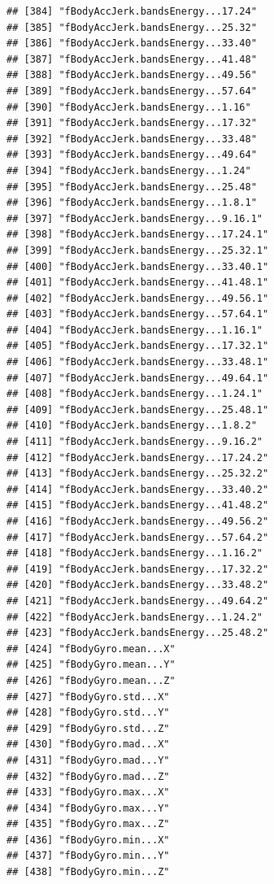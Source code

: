 \documentclass[
]{article}
\begin{document}
\begin{verbatim}
## [384] "fBodyAccJerk.bandsEnergy...17.24"    
## [385] "fBodyAccJerk.bandsEnergy...25.32"    
## [386] "fBodyAccJerk.bandsEnergy...33.40"    
## [387] "fBodyAccJerk.bandsEnergy...41.48"    
## [388] "fBodyAccJerk.bandsEnergy...49.56"    
## [389] "fBodyAccJerk.bandsEnergy...57.64"    
## [390] "fBodyAccJerk.bandsEnergy...1.16"     
## [391] "fBodyAccJerk.bandsEnergy...17.32"    
## [392] "fBodyAccJerk.bandsEnergy...33.48"    
## [393] "fBodyAccJerk.bandsEnergy...49.64"    
## [394] "fBodyAccJerk.bandsEnergy...1.24"     
## [395] "fBodyAccJerk.bandsEnergy...25.48"    
## [396] "fBodyAccJerk.bandsEnergy...1.8.1"    
## [397] "fBodyAccJerk.bandsEnergy...9.16.1"   
## [398] "fBodyAccJerk.bandsEnergy...17.24.1"  
## [399] "fBodyAccJerk.bandsEnergy...25.32.1"  
## [400] "fBodyAccJerk.bandsEnergy...33.40.1"  
## [401] "fBodyAccJerk.bandsEnergy...41.48.1"  
## [402] "fBodyAccJerk.bandsEnergy...49.56.1"  
## [403] "fBodyAccJerk.bandsEnergy...57.64.1"  
## [404] "fBodyAccJerk.bandsEnergy...1.16.1"   
## [405] "fBodyAccJerk.bandsEnergy...17.32.1"  
## [406] "fBodyAccJerk.bandsEnergy...33.48.1"  
## [407] "fBodyAccJerk.bandsEnergy...49.64.1"  
## [408] "fBodyAccJerk.bandsEnergy...1.24.1"   
## [409] "fBodyAccJerk.bandsEnergy...25.48.1"  
## [410] "fBodyAccJerk.bandsEnergy...1.8.2"    
## [411] "fBodyAccJerk.bandsEnergy...9.16.2"   
## [412] "fBodyAccJerk.bandsEnergy...17.24.2"  
## [413] "fBodyAccJerk.bandsEnergy...25.32.2"  
## [414] "fBodyAccJerk.bandsEnergy...33.40.2"  
## [415] "fBodyAccJerk.bandsEnergy...41.48.2"  
## [416] "fBodyAccJerk.bandsEnergy...49.56.2"  
## [417] "fBodyAccJerk.bandsEnergy...57.64.2"  
## [418] "fBodyAccJerk.bandsEnergy...1.16.2"   
## [419] "fBodyAccJerk.bandsEnergy...17.32.2"  
## [420] "fBodyAccJerk.bandsEnergy...33.48.2"  
## [421] "fBodyAccJerk.bandsEnergy...49.64.2"  
## [422] "fBodyAccJerk.bandsEnergy...1.24.2"   
## [423] "fBodyAccJerk.bandsEnergy...25.48.2"  
## [424] "fBodyGyro.mean...X"                  
## [425] "fBodyGyro.mean...Y"                  
## [426] "fBodyGyro.mean...Z"                  
## [427] "fBodyGyro.std...X"                   
## [428] "fBodyGyro.std...Y"                   
## [429] "fBodyGyro.std...Z"                   
## [430] "fBodyGyro.mad...X"                   
## [431] "fBodyGyro.mad...Y"                   
## [432] "fBodyGyro.mad...Z"                   
## [433] "fBodyGyro.max...X"                   
## [434] "fBodyGyro.max...Y"                   
## [435] "fBodyGyro.max...Z"                   
## [436] "fBodyGyro.min...X"                   
## [437] "fBodyGyro.min...Y"                   
## [438] "fBodyGyro.min...Z"                   

\end{verbatim}
\end{document}
